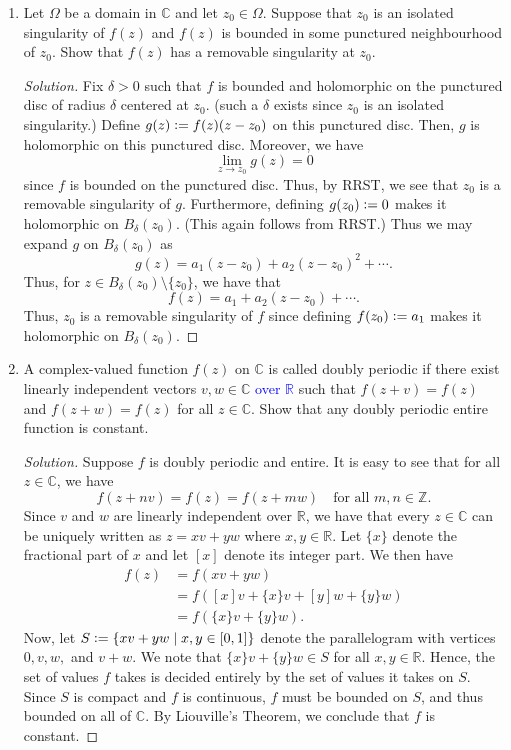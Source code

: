 \documentclass[11pt]{article}
\theoremstyle{definition}
\newenvironment{soln}{\begin{proof}[Solution]}{\end{proof}}
\begin{document}
\begin{enumerate}[leftmargin=*]
    \item Let $\Omega$ be a domain in $\mathbb{C}$ and let $z_0 \in \Omega$. Suppose that $z_0$ is an isolated singularity of $f(z)$ and $f(z)$ is bounded in some punctured neighbourhood of $z_0$. Show that $f(z)$ has a removable singularity at $z_0$. 
    
    \begin{soln}
        Fix $\delta > 0$ such that $f$ is bounded and holomorphic on the punctured disc of radius $\delta$ centered at $z_0$. (such a $\delta$ exists since $z_0$ is an isolated singularity.) Define $g(z) \vcentcolon= f(z)(z-z_0)$ on this punctured disc. Then, $g$ is holomorphic on this punctured disc. Moreover, we have
    \[
        \lim_{z \to z_0} g(z) = 0
    \]
    since $f$ is bounded on the punctured disc. Thus, by RRST, we see that $z_0$ is a removable singularity of $g$. Furthermore, defining $g(z_0) \vcentcolon= 0$ makes it holomorphic on $B_{\delta}(z_0)$. (This again follows from RRST.) Thus we may expand $g$ on $B_{\delta}(z_0)$ as
    \[
        g(z) = a_1(z-z_0) + a_2(z-z_0)^2 + \cdots.
    \]
    Thus, for $z \in B_{\delta}(z_0) \setminus \{z_0\}$, we have that
    \[
        f(z) = a_1 + a_2(z-z_0) + \cdots.
    \]
    Thus, $z_0$ is a removable singularity of $f$ since defining $f(z_0) \vcentcolon= a_1$ makes it holomorphic on $B_{\delta}(z_0)$.
    \end{soln}
    
    \item A complex-valued function $f(z)$ on $\mathbb{C}$ is called doubly periodic if there exist linearly independent vectors $v,w \in \mathbb{C}$ \textcolor{blue}{over $\mathbb{R}$} such that $f(z+v) = f(z)$ and $f(z+w) = f(z)$ for all $z \in \mathbb{C}$. Show that any doubly periodic entire function is constant. 

    \begin{soln}
        Suppose $f$ is doubly periodic and entire. It is easy to see that for all $z \in \mathbb{C}$, we have
        \[
            f(z + nv) = f(z) = f(z + mw) \quad \text{for all } m,n \in \mathbb{Z}.
        \]
        Since $v$ and $w$ are linearly independent over $\mathbb{R}$, we have that every $z \in \mathbb{C}$ can be uniquely written as $z = xv + yw$ where $x,y \in \mathbb{R}$. Let $\{x\}$ denote the fractional part of $x$ and let $[x]$ denote its integer part. We then have
        \begin{align*}
            f(z) &= f(xv + yw) \\
            &= f([x]v + \{x\}v + [y]w + \{y\}w) \\
            &= f(\{x\}v + \{y\}w).
        \end{align*}
        Now, let $S \vcentcolon= \left\{ xv + yw \mid x,y \in [0,1] \right\}$ denote the parallelogram with vertices $0,v,w,$ and $v+w$. We note that $\{x\}v + \{y\}w \in S$ for all $x,y \in \mathbb{R}$. Hence, the set of values $f$ takes is decided entirely by the set of values it takes on $S$. Since $S$ is compact and $f$ is continuous, $f$ must be bounded on $S$, and thus bounded on all of $\mathbb{C}$. By Liouville's Theorem, we conclude that $f$ is constant.
    \end{soln}
    

\end{enumerate}
\end{document}
